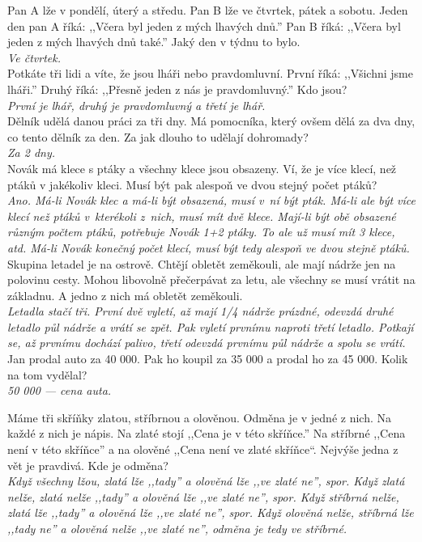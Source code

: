 \begin{multicols}{\value{columnsgames}}
\noindent
Pan A lže v pondělí, úterý a středu. Pan B lže ve čtvrtek, 
pátek a sobotu. Jeden den pan A říká: ,,Včera byl jeden z mých 
lhavých dnů.'' Pan B říká: ,,Včera byl jeden z mých lhavých dnů 
také.'' Jaký den v týdnu to bylo.\\[1 mm]
{\sl Ve čtvrtek.}\\

\noindent
Potkáte tři lidi a víte, že jsou lháři nebo pravdomluvní. 
První říká: ,,Všichni jsme lháři.'' Druhý říká: ,,Přesně jeden z 
nás je pravdomluvný.'' Kdo jsou?\\[1 mm]
{\sl První je lhář, druhý je pravdomluvný a třetí je lhář.}\\

\noindent
Dělník udělá danou práci za tři dny. Má pomocníka, který 
ovšem dělá za dva dny, co tento dělník za den. Za jak dlouho 
to udělají dohromady?\\[1 mm]
{\sl Za 2 dny.}\\

\noindent
Novák má klece s ptáky a všechny klece jsou obsazeny. Ví, 
že je více klecí, než ptáků v jakékoliv kleci. Musí být pak alespoň 
ve dvou stejný počet ptáků?\\[1 mm]
{\sl Ano. Má-li Novák klec a má-li být obsazená, musí v~ní 
být pták. Má-li ale být více klecí než ptáků v~kterékoli 
z~nich, musí mít dvě klece. Mají-li být obě obsazené různým 
počtem ptáků, potřebuje Novák 1+2 ptáky. To ale už musí mít 3 
klece, atd. Má-li Novák konečný počet klecí, musí být tedy alespoň 
ve dvou stejně ptáků.}\\

\noindent
Skupina letadel je na ostrově. Chtějí obletět zeměkouli, 
ale mají nádrže jen na polovinu cesty. Mohou libovolně přečerpávat 
za letu, ale všechny se musí vrátit na základnu. A jedno z nich 
má obletět zeměkouli.\\[1 mm]
{\sl Letadla stačí tři. První dvě vyletí, až mají 1/4 nádrže prázdné, 
odevzdá druhé letadlo půl nádrže a vrátí se zpět. Pak vyletí 
prvnímu naproti třetí letadlo. Potkají se, až prvnímu dochází 
palivo, třetí odevzdá prvnímu půl nádrže a spolu se vrátí.}\\

\noindent
Jan prodal auto za 40 000. Pak ho koupil za 35 000 a prodal 
ho za 45 000. Kolik na tom vydělal?\\[1 mm]
{\sl 50 000 --- cena auta.}

\noindent
Máme tři skříňky zlatou, stříbrnou a olověnou. Odměna je 
v jedné z nich. Na každé z nich je nápis. Na zlaté stojí ,,Cena 
je v této skříňce.'' Na stříbrné ,,Cena není v této skříňce'' 
a na olověné ,,Cena není ve zlaté skříňce``. Nejvýše jedna z vět 
je pravdivá. Kde je odměna?\\[1 mm]
{\sl Když všechny lžou, zlatá lže ,,tady'' a olověná lže ,,ve zlaté 
ne'', spor. Když zlatá nelže, zlatá nelže ,,tady'' a olověná lže 
,,ve zlaté ne'', spor. Když stříbrná nelže, zlatá lže ,,tady'' 
a olověná lže ,,ve zlaté ne'', spor. Když olověná nelže, stříbrná 
lže ,,tady ne'' a olověná nelže ,,ve zlaté ne'', odměna je tedy 
ve stříbrné.}\\


\end{multicols}
